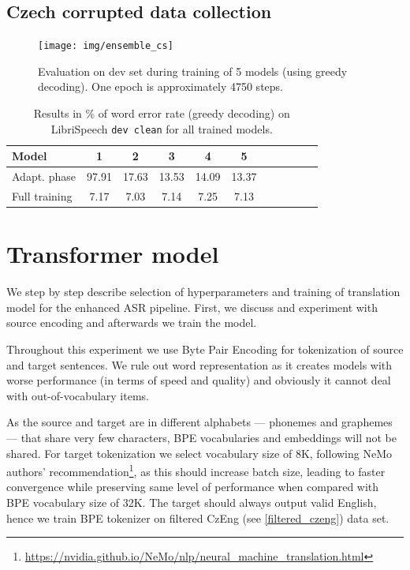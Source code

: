 \subsection{Czech corrupted data collection}


\begin{figure}[h]
		\texttt{[image: img/ensemble\_cs]}
		\caption{Evaluation on dev set during training of 5 models (using greedy decoding). One epoch is approximately 4750 steps.}
		\label{fig:ensemble_training_cs}
\end{figure}

\begin{table}[h]
		\centering
		\begin{tabular}{l|cccccccccc}
			\bf Model & \bf 1 & \bf 2 & \bf 3 & 4 & \bf 5  \\
			\hline 
			
			Adapt. phase &
            97.91 &
            17.63 &
            13.53 &
            14.09 &
            13.37 \\
            Full training &
            7.17 &
            7.03 &
            7.14 &
            7.25 &
            7.13 
			
		\end{tabular}
		\caption{Results in \% of word error rate (greedy decoding) on LibriSpeech \texttt{dev clean} for all trained models.}
		\label{tab:cs_folds}
\end{table}

\section{Transformer model}
We step by step describe selection of hyperparameters and training of translation model for the enhanced ASR pipeline. First, we discuss and experiment with source encoding and afterwards we train the model.

Throughout this experiment we use Byte Pair Encoding for tokenization of source and target sentences. We rule out word representation as it creates models with worse performance (in terms of speed and quality)  and obviously it cannot deal with out-of-vocabulary items.

As the source and target are in different alphabets --- phonemes and graphemes --- that share very few characters, BPE vocabularies and embeddings will not be shared. For target tokenization we select vocabulary size of 8K, following NeMo authors' recommendation\footnote{\url{https://nvidia.github.io/NeMo/nlp/neural_machine_translation.html}}, as this should increase batch size, leading to faster convergence while preserving same level of performance when compared with BPE vocabulary size of 32K. The target should always output valid English, hence we train BPE tokenizer on filtered CzEng (see \cref{filtered_czeng}) data set.

